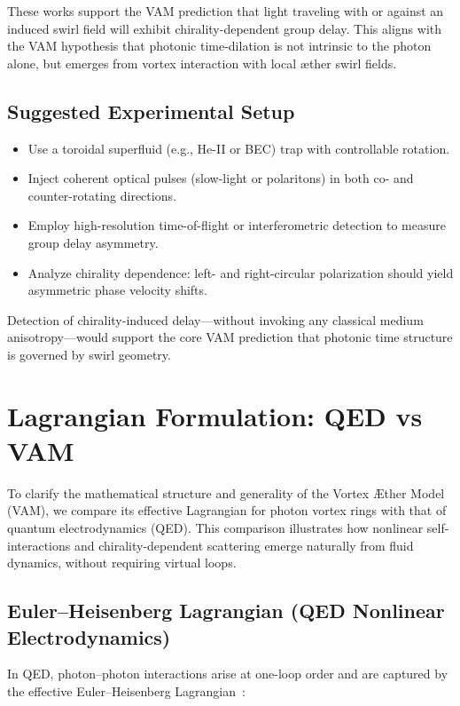         These works support the VAM prediction that light traveling with or against an induced swirl field will exhibit chirality-dependent group delay. This aligns with the VAM hypothesis that photonic time-dilation is not intrinsic to the photon alone, but emerges from vortex interaction with local æther swirl fields.

        \subsection*{Suggested Experimental Setup}
        \begin{itemize}
            \item Use a toroidal superfluid (e.g., He-II or BEC) trap with controllable rotation.
            \item Inject coherent optical pulses (slow-light or polaritons) in both co- and counter-rotating directions.
            \item Employ high-resolution time-of-flight or interferometric detection to measure group delay asymmetry.
            \item Analyze chirality dependence: left- and right-circular polarization should yield asymmetric phase velocity shifts.
        \end{itemize}

        Detection of chirality-induced delay—without invoking any classical medium anisotropy—would support the core VAM prediction that photonic time structure is governed by swirl geometry.

\section{Lagrangian Formulation: QED vs VAM}

    To clarify the mathematical structure and generality of the Vortex \AE ther Model (VAM), we compare its effective Lagrangian for photon vortex rings with that of quantum electrodynamics (QED). This comparison illustrates how nonlinear self-interactions and chirality-dependent scattering emerge naturally from fluid dynamics, without requiring virtual loops.

    \subsection{Euler–Heisenberg Lagrangian (QED Nonlinear Electrodynamics)}

    In QED, photon–photon interactions arise at one-loop order and are captured by the effective Euler–Heisenberg Lagrangian~\cite{heisenberg1936}:

